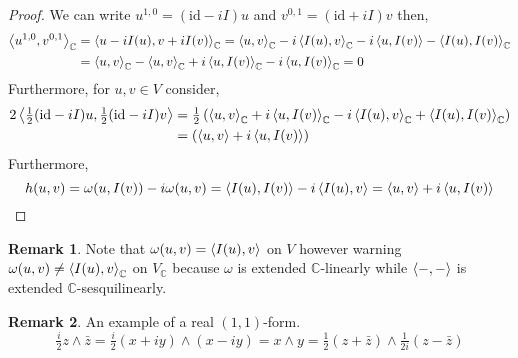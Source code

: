 \documentclass[12pt]{extarticle}
\newcommand{\C}{\mathbb{C}}
\newcommand{\id}{\mathrm{id}}
\theoremstyle{definition}
\newtheorem{remark}{Remark}
\begin{document}
\begin{proof}
We can write $u^{1,0} = (\id  - i I)u$ and $v^{0,1} = (\id + i I) v$ then,
\begin{align*}
\inner{u^{1,0}}{v^{0,1}}_\C & = \inner{u - i I(u)}{v + i I(v)}_\C = \inner{u}{v}_\C - i \inner{I(u)}{v}_\C - i \inner{u}{I(v)} - \inner{I(u)}{I(v)}_\C
\\
& = \inner{u}{v}_\C - \inner{u}{v}_\C + i \inner{u}{I(v)}_\C - i \inner{u}{I(v)}_\C = 0
\end{align*}
Furthermore, for $u,v \in V$ consider,
\begin{align*}
2 \inner{\tfrac{1}{2}(\id - i I) u}{\tfrac{1}{2}(\id - i I) v} & = \tfrac{1}{2} \left( \inner{u}{v}_\C + i \inner{u}{I(v)}_\C - i \inner{I(u)}{v}_\C + \inner{I(u)}{I(v)}_\C  \right)
\\
& = \left( \inner{u}{v} + i \inner{u}{I(v)} \right) 
\end{align*}
Furthermore,
\[ h(u, v) = \omega(u, I(v)) - i \omega(u, v) = \left< I(u), I(v) \right> - i \left< I(u), v \right> = \left< u, v \right> + i \left< u, I(v) \right> \]
\end{proof}

\begin{remark}
Note that $\omega(u,v) = \left< I(u), v \right>$ on $V$ however warning $\omega(u, v) \neq \inner{I(u)}{v}_\C$ on $V_\C$ because $\omega$ is extended $\C$-linearly while $\left< -, - \right>$ is extended $\C$-sesquilinearly.
\end{remark}


\begin{remark}
An example of a real $(1,1)$-form.
\[ \tfrac{i}{2} z \wedge \bar{z} = \tfrac{i}{2} (x + i y) \wedge (x - i y) = x \wedge y = \tfrac{1}{2}(z + \bar{z}) \wedge \tfrac{1}{2 i}(z - \bar{z})  \] 
\end{remark}
\end{document}

